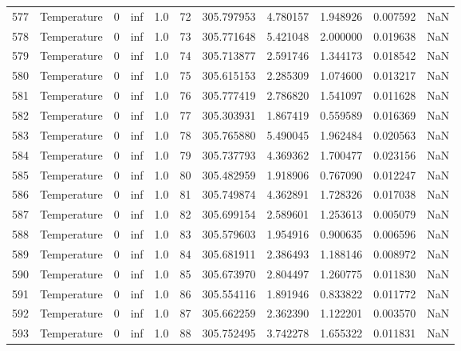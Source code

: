 \begin{tabular}{llrrrrrrrrr}
577 &  Temperature &       0 &  inf &  1.0 &   72 &  305.797953 &  4.780157 &  1.948926 &   0.007592 &      NaN \\
578 &  Temperature &       0 &  inf &  1.0 &   73 &  305.771648 &  5.421048 &  2.000000 &   0.019638 &      NaN \\
579 &  Temperature &       0 &  inf &  1.0 &   74 &  305.713877 &  2.591746 &  1.344173 &   0.018542 &      NaN \\
580 &  Temperature &       0 &  inf &  1.0 &   75 &  305.615153 &  2.285309 &  1.074600 &   0.013217 &      NaN \\
581 &  Temperature &       0 &  inf &  1.0 &   76 &  305.777419 &  2.786820 &  1.541097 &   0.011628 &      NaN \\
582 &  Temperature &       0 &  inf &  1.0 &   77 &  305.303931 &  1.867419 &  0.559589 &   0.016369 &      NaN \\
583 &  Temperature &       0 &  inf &  1.0 &   78 &  305.765880 &  5.490045 &  1.962484 &   0.020563 &      NaN \\
584 &  Temperature &       0 &  inf &  1.0 &   79 &  305.737793 &  4.369362 &  1.700477 &   0.023156 &      NaN \\
585 &  Temperature &       0 &  inf &  1.0 &   80 &  305.482959 &  1.918906 &  0.767090 &   0.012247 &      NaN \\
586 &  Temperature &       0 &  inf &  1.0 &   81 &  305.749874 &  4.362891 &  1.728326 &   0.017038 &      NaN \\
587 &  Temperature &       0 &  inf &  1.0 &   82 &  305.699154 &  2.589601 &  1.253613 &   0.005079 &      NaN \\
588 &  Temperature &       0 &  inf &  1.0 &   83 &  305.579603 &  1.954916 &  0.900635 &   0.006596 &      NaN \\
589 &  Temperature &       0 &  inf &  1.0 &   84 &  305.681911 &  2.386493 &  1.188146 &   0.008972 &      NaN \\
590 &  Temperature &       0 &  inf &  1.0 &   85 &  305.673970 &  2.804497 &  1.260775 &   0.011830 &      NaN \\
591 &  Temperature &       0 &  inf &  1.0 &   86 &  305.554116 &  1.891946 &  0.833822 &   0.011772 &      NaN \\
592 &  Temperature &       0 &  inf &  1.0 &   87 &  305.662259 &  2.362390 &  1.122201 &   0.003570 &      NaN \\
593 &  Temperature &       0 &  inf &  1.0 &   88 &  305.752495 &  3.742278 &  1.655322 &   0.011831 &      NaN \\

\end{tabular}

